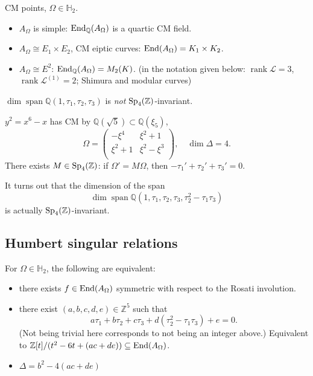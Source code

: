 \documentclass[reqno]{amsart} 
\numberwithin{theorem}{section}
\numberwithin{equation}{section}
\begin{document}
CM points, $\Omega \in \mathbb{H}_2$.
\begin{itemize}
\item $A_\Omega$ is simple: $\operatorname{End}_{\mathbb{Q}}(A_\Omega)$ is a quartic CM field.
\item $A_{\Omega} \cong E_1 \times E_2$, CM eiptic curves: $\operatorname{End}(A_{\Omega}) = K_1 \times K_2$. 
\item $A_{\Omega} \cong E^2$: $\operatorname{End}_{\mathbb{Q}}(A_\Omega) = M_2(K)$. (in the notation given below: $\operatorname{rank} \mathcal{L} = 3$, $\operatorname{rank} \mathcal{L}^{(1)} = 2$; Shimura and modular curves)
\end{itemize}
\begin{remark}
  $\dim \operatorname{span} \mathbb{Q}(1, \tau_1, \tau_2, \tau_3)$ is \emph{not} $\operatorname{Sp}_4(\mathbb{Z})$-invariant.
\end{remark}
\begin{example}
  $y^2 = x^6 - x$ has CM by $\mathbb{Q}(\sqrt{5}) \subset \mathbb{Q}(\xi_5)$,
  \begin{equation*}
    \Omega =
    \begin{pmatrix}
      - \xi^4 &  \xi^2 + 1 \\
      \xi^2 + 1 & \xi^2 - \xi^3  \\
    \end{pmatrix},
    \quad
    \dim \Delta = 4.
  \end{equation*}
  There exists $M \in \operatorname{Sp}_4(\mathbb{Z})$: if $\Omega ' = M \Omega$, then $- \tau_1 ' + \tau_2 ' + \tau_3' = 0$.
\end{example}

It turns out that the dimension of the span
\begin{equation*}
  \dim \operatorname{span} \mathbb{Q}(1, \tau_1, \tau_2, \tau_3, \tau_2^2 - \tau_1 \tau_3)
\end{equation*}
is actually $\operatorname{Sp}_4(\mathbb{Z})$-invariant.

\subsection{Humbert singular relations}

\begin{proposition}
  For $\Omega \in \mathbb{H}_2$, the following are equivalent:
  \begin{itemize}
  \item there exists $f \in \operatorname{End}(A_\Omega)$ symmetric with respect to the Rosati involution.
  \item there exist $(a, b, c, d, e) \in \mathbb{Z}^5$ such that
    \begin{equation*}
      a \tau_1 + b \tau_2 + c \tau_3 + d(\tau_2^2 - \tau_1 \tau_3) + e = 0.
    \end{equation*}
    (Not being trivial here corresponds to not being an integer above.)
    Equivalent to $\mathbb{Z}[t] /(t^2 - 6 t +(a c + d e)) \subseteq \operatorname{End}(A_\Omega)$.
  \item $\Delta = b^2 - 4(a c + d e)$
  \end{itemize}
\end{proposition}
\end{document}
